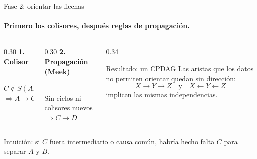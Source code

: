 \documentclass[aspectratio=169,11pt]{beamer}
\begin{document}
\begin{frame}[t]{Fase 2: orientar las flechas}
  \framesubtitle{Primero los colisores, después reglas de propagación.}
  \vspace{0.3cm}
  \begin{columns}[T,onlytextwidth]
    \begin{column}{0.30\textwidth}
      \centering\textbf{\color{upmblue}1. Colisor}\\[0.25cm]
      \\[0.25cm]
      {\small $C\notin S(A,B)=\emptyset$\\
      $\Rightarrow A\to C\leftarrow B$}
    \end{column}
    \begin{column}{0.30\textwidth}
      \centering\textbf{\color{upmblue}2. Propagación (Meek)}\\[0.25cm]
      \\[0.25cm]
      {\small Sin ciclos ni colisores nuevos\\
      $\Rightarrow C\to D$}
    \end{column}
    \begin{column}{0.34\textwidth}
      \begin{block}{Resultado: un CPDAG}
        Las aristas que los datos no permiten orientar quedan sin dirección:
        \[
          X\to Y\to Z \quad\text{y}\quad X\leftarrow Y\leftarrow Z
        \]
        implican las mismas independencias.
      \end{block}
    \end{column}
  \end{columns}
  \vfill
  {\scriptsize\color{upmgray}Intuición: si $C$ fuera intermediario o causa
  común, habría hecho falta $C$ para separar $A$ y $B$.}
\end{frame}
\end{document}
